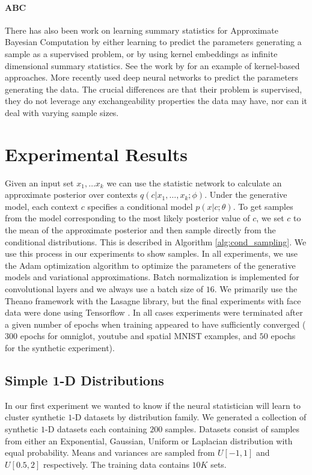 \documentclass{article} %
\begin{document}
\paragraph{ABC}
There has also been work on learning summary statistics for Approximate Bayesian Computation by either learning to predict the parameters generating a sample as a supervised problem, or by using kernel embeddings as infinite dimensional summary statistics. See the work by \citet{kernel_bayes} for an example of kernel-based approaches. More recently \citet{deep_summary_statistics} used deep neural networks to predict the parameters generating the data. The crucial differences are that their problem is supervised, they do not leverage any exchangeability properties the data may have, nor can it deal with varying sample sizes.
\vspace{-0.5em}
\section{Experimental Results}
Given an input set $x_1, \dots x_k$ we can use the statistic network to calculate an approximate posterior over contexts $q(c|x_1, \dots, x_k; \phi)$. Under the generative model, each context $c$ specifies a conditional model $p(x | c ;\theta)$. To get samples from the model corresponding to the most likely posterior value of $c$, we set $c$ to the mean of the approximate posterior and then sample directly from the conditional distributions. This is described in Algorithm \ref{alg:cond_sampling}. We use this process in our experiments to show samples. In all experiments, we use the Adam optimization algorithm \citep{adam} to optimize the parameters of the generative models and variational approximations. Batch normalization \citep{batchnorm} is implemented for convolutional layers and we always use a batch size of $16$. We primarily use the Theano \citep{theano} framework with the Lasagne \citep{lasagne} library, but the final experiments with face data were done using Tensorflow \citep{tensorflow}. In all cases experiments were terminated after a given number of epochs when training appeared to have sufficiently converged ($300$ epochs for omniglot, youtube and spatial MNIST examples, and $50$ epochs for the synthetic experiment).

\subsection{Simple 1-D Distributions}
In our first experiment we wanted to know if the neural statistician will learn to cluster synthetic $1$-D datasets by distribution family. We generated a collection of synthetic $1$-D datasets each containing $200$ samples. Datasets consist of samples from either an Exponential, Gaussian, Uniform or Laplacian distribution with equal probability. Means and variances are sampled from $U[-1,1]$ and $U[0.5,2]$ respectively. The training data contains $10K$ sets.
\end{document}
